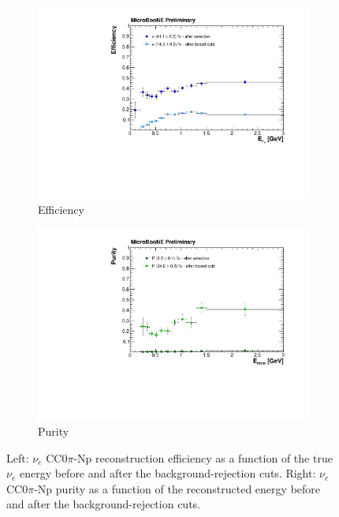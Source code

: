 \begin{figure}
  \begin{subfigure}{0.48\textwidth}
    \includegraphics[width=\linewidth]{figures/eff_after.pdf}
    \caption{Efficiency} 
  \end{subfigure}
    \begin{subfigure}{0.48\textwidth}
    \includegraphics[width=\linewidth]{figures/purity_after.pdf}
    \caption{Purity} 
  \end{subfigure}
  \caption{Left: $\nu_{e}$ CC$0\pi$-Np reconstruction efficiency as a function of the true $\nu_{e}$ energy before and after the background-rejection cuts. Right: $\nu_{e}$ CC$0\pi$-Np purity as a function of the reconstructed energy before and after the background-rejection cuts.}
  \label{fig:effafter}
\end{figure}

